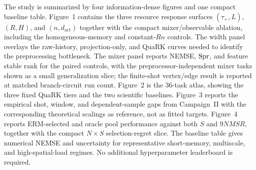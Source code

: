 The study is summarized by four information-dense figures and one compact
baseline table.  Figure~1 contains the three resource response surfaces
$(\tau_+,L)$, $(R,H)$, and $(n,d_{\mathrm{act}})$ together with the compact
mixer/observable ablation, including the homogeneous-memory and constant-$Rn$
controls.  The width panel overlays the raw-history, projection-only, and
QuaRK curves needed to identify the preprocessing bottleneck.  The mixer panel
reports NEMSE, $\operatorname{Spr}$, and feature stable rank for the paired controls,
with the preprocessor-independent mixer tasks shown as a small generalization
slice; the finite-shot vertex/edge result is reported at matched branch-circuit
run count.  Figure~2 is the 36-task atlas, showing the three fixed QuaRK tiers
and the two scientific baselines.  Figure~3 reports the empirical shot, window,
and dependent-sample gaps from Campaign~II with the corresponding theoretical
scalings as reference, not as fitted targets.  Figure~4 reports ERM-selected
and oracle pool performance against both $S$ and $9NMSR$, together with the
compact $N\times S$ selection-regret slice.  The baseline table gives numerical
NEMSE and uncertainty for representative short-memory, multiscale, and
high-spatial-load regimes.  No additional hyperparameter leaderboard is
required.
